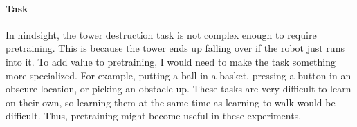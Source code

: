 \documentclass[12pt, a4paper]{article}
\begin{document}
\paragraph{Task} In hindsight, the tower destruction task is not complex enough to require pretraining. This is because the tower ends up falling over if the robot just runs into it. To add value to pretraining, I would need to make the task something more specialized. For example, putting a ball in a  basket, pressing a button in an obscure location, or picking an obstacle up. These tasks are very difficult to learn on their own, so learning them at the same time as learning to walk would be difficult. Thus, pretraining might become useful in these experiments. 
\end{document}
